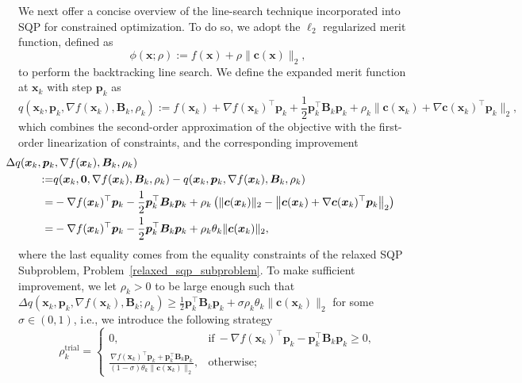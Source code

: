 \documentclass[aos]{imsart}
\numberwithin{equation}{section}
\theoremstyle{plain}
\begin{document}
We next offer a concise overview of the line-search technique incorporated into SQP for constrained optimization.
To do so, we adopt the $\ell_2$ regularized merit function, defined as
\begin{equation}
    \phi(\bm{x};\rho):= f(\bm{x}) + \rho \|\bm{c}(\bm{x})\|_2,
\end{equation}
to perform the backtracking line search. We define the expanded merit function at $\bm{x}_k$ with step $\bm{p}_k$ as 
\begin{equation}
    q(\bm{x}_k,\bm{p}_k,\nabla f(\bm{x}_k),\bm{B}_k,\rho_k) := f(\bm{x}_{k}) + \nabla f(\bm{x}_k)^{\top} \bm{p}_k + \frac{1}{2} \bm{p}_k^{\top} \bm{B}_k \bm{p}_k + \rho_k \|\bm{c}(\bm{x}_k) + \nabla \bm{c}(\bm{x}_k)^{\top}\bm{p}_k\|_2,
\end{equation}
which combines the second-order approximation of the objective with the first-order linearization of constraints, and the corresponding improvement 
\begin{equation}
\begin{split}
    & 
    \hspace{-15mm}
    \Delta q(\bm{x}_k,\bm{p}_k,\nabla f(\bm{x}_k), \bm{B}_k,\rho_k)\\
    := & q(\bm{x}_k,\bm{0},\nabla f(\bm{x}_k),\bm{B}_k,\rho_k) - q(\bm{x}_k,\bm{p}_k,\nabla f(\bm{x}_k),\bm{B}_k,\rho_k)\\
    = & -\nabla f(\bm{x}_k)^{\top} \bm{p}_k - \frac{1}{2} \bm{p}_k^{\top} \bm{B}_k \bm{p}_k + \rho_k \left(\|\bm{c}(\bm{x}_k)\|_2 - \left\|\bm{c}(\bm{x}_k) + \nabla \bm{c}(\bm{x}_k)^{\top}\bm{p}_k\right\|_2 \right)\\
    = & -\nabla f(\bm{x}_k)^{\top} \bm{p}_k - \frac{1}{2} \bm{p}_k^{\top} \bm{B}_k \bm{p}_k + \rho_k \theta_k \|\bm{c}(\bm{x}_k)\|_2,
\end{split}
\end{equation}
where the last equality comes from the equality constraints of the relaxed SQP Subproblem, Problem~\eqref{relaxed_sqp_subproblem}. 
To make sufficient improvement, we let $\rho_k>0$ to be large enough such that
$\Delta q(\bm{x}_k,\bm{p}_k,\nabla f(\bm{x}_k),\bm{B}_k;\rho_k) \geq \frac{1}{2} \bm{p}_k^{\top} \bm{B}_k \bm{p}_k + \sigma \rho_k \theta_k \|\bm{c}(\bm{x}_k)\|_2$ for some $\sigma \in (0,1)$, i.e., we introduce the following strategy
\begin{equation*}
        \rho_k^{\text{trial}} = \left \{ \begin{array}{cc}
           0,  & \text{if}~ -\nabla f(\bm{x}_k)^{\top} \bm{p}_k - \bm{p}_k^{\top} \bm{B}_k \bm{p}_k \geq 0, \\
           \frac{\nabla f(\bm{x}_k)^{\top} \bm{p}_k + \bm{p}_k^{\top} \bm{B}_k \bm{p}_k}{(1-\sigma)\theta_k \|\bm{c}(\bm{x}_k)\|_2},  &  \text{otherwise;}
        \end{array}\right.
\end{equation*}
\end{document}

